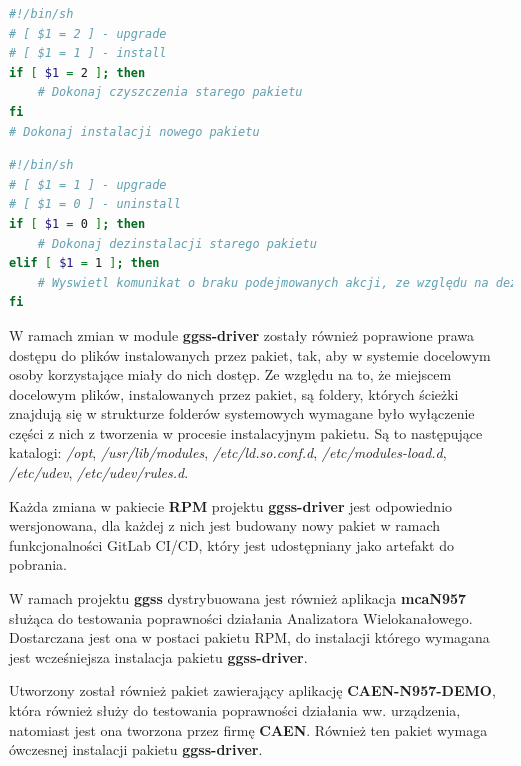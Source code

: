\begin{lstlisting}[language=bash, caption={Przykład wykorzystania właściwości argumentów dla skryptu \textit{post-install}}, label={lst:rpmUpgrade}]
#!/bin/sh
# [ $1 = 2 ] - upgrade
# [ $1 = 1 ] - install
if [ $1 = 2 ]; then
    # Dokonaj czyszczenia starego pakietu
fi
# Dokonaj instalacji nowego pakietu
\end{lstlisting}

\begin{lstlisting}[language=bash, caption={Przykład wykorzystania właściwości argumentów dla skryptu \textit{pre-uninstall}}, label={lst:rpmUpgradePt2}]
#!/bin/sh
# [ $1 = 1 ] - upgrade
# [ $1 = 0 ] - uninstall
if [ $1 = 0 ]; then
    # Dokonaj dezinstalacji starego pakietu
elif [ $1 = 1 ]; then
    # Wyswietl komunikat o braku podejmowanych akcji, ze względu na dezinstalację wykonaną przez skrypt post-install
fi

\end{lstlisting}

W ramach zmian w module \textbf{ggss-driver} zostały również poprawione prawa dostępu do plików instalowanych przez pakiet, tak, aby w systemie docelowym osoby korzystające miały do nich dostęp. 
Ze względu na to, że miejscem docelowym plików, instalowanych przez pakiet, są foldery, których ścieżki znajdują się w strukturze folderów systemowych wymagane było wyłączenie części z nich z tworzenia w procesie instalacyjnym pakietu. Są to następujące katalogi: \textit{/opt}, \textit{/usr/lib/modules}, \textit{/etc/ld.so.conf.d}, \textit{/etc/modules-load.d}, \textit{/etc/udev}, \textit{/etc/udev/rules.d}.

Każda zmiana w pakiecie \textbf{RPM} projektu \textbf{ggss-driver} jest odpowiednio wersjonowana, dla każdej z nich jest budowany nowy pakiet w ramach funkcjonalności GitLab CI/CD, który jest udostępniany jako artefakt do pobrania.

W ramach projektu \textbf{ggss} dystrybuowana jest również aplikacja \textbf{mcaN957} służąca do testowania poprawności działania Analizatora Wielokanałowego. Dostarczana jest ona w postaci pakietu RPM, do instalacji którego wymagana jest wcześniejsza instalacja pakietu \textbf{ggss-driver}.

Utworzony został również pakiet zawierający aplikację \textbf{CAEN-N957-DEMO}, która również służy do testowania poprawności działania ww. urządzenia, natomiast jest ona tworzona przez firmę \textbf{CAEN}. Również ten pakiet wymaga ówczesnej instalacji pakietu \textbf{ggss-driver}.


